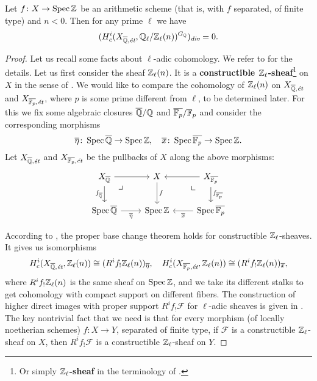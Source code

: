 \documentclass{article}
\numberwithin{equation}{section}
\begin{document}
\begin{proposition}
  \label{prop:l-adic-cohomology-key-lemma}
  Let $f\colon X\to \operatorname{Spec} \mathbb{Z}$ be an arithmetic scheme (that is, with $f$
  separated, of finite type) and $n < 0$. Then for any prime $\ell$ we have
  $$(H^i_c (X_{\overline{\mathbb{Q}},\text{\it ét}}, \mathbb{Q}_\ell/\mathbb{Z}_\ell (n))^{G_{\mathbb{Q}}})_{\text{\it div}} = 0.$$

  \begin{proof}
    Let us recall some facts about $\ell$-adic cohomology. We refer to
    \cite[Exposé~VI]{SGA5} for the details. Let us first consider the sheaf
    $\mathbb{Z}_\ell (n)$. It is a
    \textbf{constructible $\mathbb{Z}_\ell$-sheaf}\footnote{Or simply
      \textbf{$\mathbb{Z}_\ell$-sheaf} in the terminology of \cite[Rapport]{SGA4-1-2}.}
    on $X$ in the sense of \cite[Exposé~VI, 1.1.1]{SGA5}. We would like to
    compare the cohomology of $\mathbb{Z}_\ell (n)$ on
    $X_{\overline{\mathbb{Q}},\text{\it ét}}$ and $X_{\overline{\mathbb{F}_p},\text{\it ét}}$,
    where $p$ is some prime different from $\ell$, to be determined later.
    For this we fix some algebraic closures $\overline{\mathbb{Q}}/\mathbb{Q}$ and
    $\overline{\mathbb{F}_p}/\mathbb{F}_p$ and consider the corresponding morphisms
    \[ \overline{\eta}\colon \operatorname{Spec} \overline{\mathbb{Q}} \to \operatorname{Spec} \mathbb{Z}, \quad
    \overline{x}\colon \operatorname{Spec} \overline{\mathbb{F}_p} \to \operatorname{Spec} \mathbb{Z}. \]
    Let $X_{\overline{\mathbb{Q}},\text{\it ét}}$ and
    $X_{\overline{\mathbb{F}_p},\text{\it ét}}$ be the pullbacks of $X$ along the above
    morphisms:
    \[ \begin{tikzcd}
      X_{\overline{\QQ}} \ar{r}\tikzpb\ar{d}[swap]{f_{\overline{\QQ}}} & X \ar{d}{f} & X_{\overline{\FF_p}} \ar{l}\ar{d}{f_{\overline{\FF_p}}}\tikzpbur \\
      \Spec \overline{\QQ} \ar{r}[swap]{\overline{\eta}} & \Spec \ZZ & \Spec \overline{\FF_p} \ar{l}{\overline{x}}
    \end{tikzcd} \]

    According to \cite[Exposé~VI, 2.2.3]{SGA5}, the proper base change theorem
    holds for constructible $\mathbb{Z}_\ell$-sheaves. It gives us isomorphisms
    \[ H^i_c (X_{\overline{\mathbb{Q}}, \text{\it ét}}, \mathbb{Z}_\ell (n)) \cong (R^i f_! \mathbb{Z}_\ell (n))_{\overline{\eta}}, \quad
    H^i_c (X_{\overline{\mathbb{F}_p}, \text{\it ét}}, \mathbb{Z}_\ell (n)) \cong (R^i f_! \mathbb{Z}_\ell (n))_{\overline{x}}, \]
    where $R^i f_! \mathbb{Z}_\ell (n)$ is the same sheaf on $\operatorname{Spec} \mathbb{Z}$, and we take
    its different stalks to get cohomology with compact support on different
    fibers. The construction of higher direct images with proper support
    $R^i f_! \mathcal{F}$ for $\ell$-adic sheaves is given in
    \cite[Exposé~VI, \S 2.2]{SGA5}. The key nontrivial fact that we need is that
    for every morphism (of locally noetherian schemes) $f\colon X\to Y$,
    separated of finite type, if $\mathcal{F}$ is a constructible
    $\mathbb{Z}_\ell$-sheaf on $X$, then $R^i f_! \mathcal{F}$ is a constructible
    $\mathbb{Z}_\ell$-sheaf on $Y$.


\end{proof}
\end{proposition}
\end{document}
